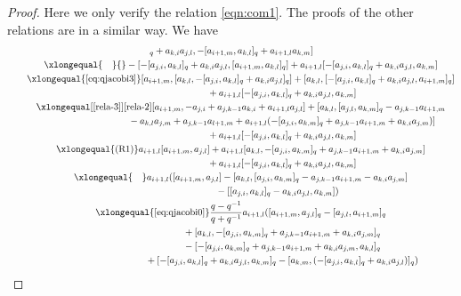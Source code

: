 \documentclass[pdftex]{sigma}
\numberwithin{equation}{section}
\begin{document}
\begin{proof}
Here we only verify the relation \eqref{eqn:com1}.
The proofs of the other relations are in a similar way.
We have
\begin{gather*}
 [- [a_{j,i}, a_{k,l} ]_q+a_{k,i}a_{j,l}, - [a_{i+1,m}, a_{k,l} ]_q+a_{i+1,l}a_{k,m} ]\\
\qquad \xlongequal{\quad} {}- [- [a_{j,i}, a_{k,l} ]_q+a_{k,i}a_{j,l}, [a_{i+1,m}, a_{k,l} ]_q ]+a_{i+1,l} [- [a_{j,i}, a_{k,l} ]_q+a_{k,i}a_{j,l}, a_{k,m} ]\\
\qquad \xlongequal{\eqref{eq:qjacobi3}} [a_{i+1,m}, [a_{k,l}, - [a_{j,i}, a_{k,l} ]_q+a_{k,i}a_{j,l} ]_q ] + [a_{k,l}, [- [a_{j,i}, a_{k,l} ]_q+a_{k,i}a_{j,l}, a_{i+1,m} ]_q ]\\
\phantom{\qquad\xlongequal{\qquad}}{} +a_{i+1,l} [- [a_{j,i}, a_{k,l} ]_q+a_{k,i}a_{j,l}, a_{k,m} ]\\
\qquad \xlongequal[\eqref{rela-3}]{\eqref{rela-2}} [a_{i+1,m}, -a_{j,i}+a_{j,k-1}a_{k,i}+a_{i+1,l}a_{j,l} ]+ [a_{k,l}, [a_{j,l}, a_{k,m} ]_q-a_{j,k-1}a_{l+1,m} \\
\phantom{\qquad\xlongequal{\qquad}}{} -a_{k,l}a_{j,m}+a_{j,k-1}a_{l+1,m} +a_{i+1,l} (- [a_{j,i}, a_{k,m} ]_q +a_{j,k-1}a_{i+1,m} +a_{k,i}a_{j,m} ) ]\\
\phantom{\qquad\xlongequal{\qquad}}{} +a_{i+1,l} [- [a_{j,i}, a_{k,l} ]_q+a_{k,i}a_{j,l}, a_{k,m} ]\\
\qquad \xlongequal{(\textrm R1)} a_{i+1,l} [a_{i+1,m}, a_{j,l} ]+a_{i+1,l} [a_{k,l}, - [a_{j,i}, a_{k,m} ]_q+a_{j,k-1}a_{i+1,m}+a_{k,i}a_{j,m} ]\\
\phantom{\qquad\xlongequal{\qquad}}{} +a_{i+1,l} [- [a_{j,i}, a_{k,l} ]_q+a_{k,i}a_{j,l}, a_{k,m} ]\\
\qquad \xlongequal{\quad} a_{i+1,l} ( [a_{i+1,m}, a_{j,l} ]- [a_{k,l}, [a_{j,i}, a_{k,m} ]_q-a_{j,k-1}a_{i+1,m}-a_{k,i}a_{j,m} ] \\
 \phantom{\qquad \xlongequal{\quad}}{} - [ [a_{j,i}, a_{k,l} ]_q-a_{k,i}a_{j,l}, a_{k,m} ] )\\
 \qquad\xlongequal{\eqref{eq:qjacobi0}} \frac{q-q^{-1}}{q+q^{-1}}a_{i+1,l} ( [a_{i+1,m}, a_{j,l} ]_q- [a_{j,l}, a_{i+1,m} ]_q \\
\phantom{\qquad\xlongequal{\qquad}}{} + [a_{k,l}, - [a_{j,i}, a_{k,m} ]_q+a_{j,k-1}a_{i+1,m}+a_{k,i}a_{j,m} ]_q \\
\phantom{\qquad\xlongequal{\qquad}}{} - [ - [a_{j,i}, a_{k,m} ]_q+a_{j,k-1}a_{i+1,m}+a_{k,i}a_{j,m}, a_{k,l} ]_q \\
\phantom{\qquad\xlongequal{\qquad}}{} + [- [a_{j,i}, a_{k,l} ]_q+a_{k,i}a_{j,l}, a_{k,m} ]_q- [ a_{k,m}, (- [a_{j,i}, a_{k,l} ]_q+a_{k,i}a_{j,l} ) ]_q )\\

\end{gather*}
\end{proof}
\end{document}
